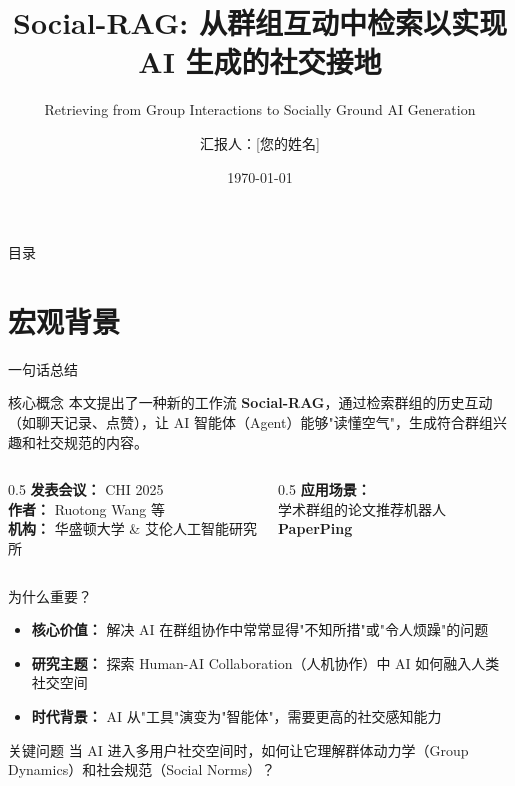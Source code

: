 \documentclass[UTF8,aspectratio=169]{ctexbeamer}
\title{Social-RAG: 从群组互动中检索以实现 AI 生成的社交接地}
\subtitle{Retrieving from Group Interactions to Socially Ground AI Generation}
\author{汇报人：[您的姓名]}
\institute{课程：人机交互}
\date{\today}
\begin{document}
\begin{frame}
\titlepage
\end{frame}

\begin{frame}{目录}
\tableofcontents
\end{frame}

\section{宏观背景}

\begin{frame}{一句话总结}
\begin{block}{核心概念}
本文提出了一种新的工作流 \textbf{Social-RAG}，通过检索群组的历史互动（如聊天记录、点赞），让 AI 智能体（Agent）能够\textcolor{myblue}{"读懂空气"}，生成符合群组兴趣和社交规范的内容。
\end{block}

\vspace{0.5cm}

\begin{columns}[T]
\begin{column}{0.5\textwidth}
\textbf{发表会议：} CHI 2025 \\
\textbf{作者：} Ruotong Wang 等 \\
\textbf{机构：} 华盛顿大学 \& 艾伦人工智能研究所
\end{column}
\begin{column}{0.5\textwidth}
\textbf{应用场景：} \\
学术群组的论文推荐机器人 \textbf{PaperPing}
\end{column}
\end{columns}
\end{frame}

\begin{frame}{为什么重要？}
\begin{itemize}
\item \textbf{核心价值：} 解决 AI 在群组协作中常常显得"不知所措"或"令人烦躁"的问题
\item \textbf{研究主题：} 探索 \textcolor{myblue}{Human-AI Collaboration}（人机协作）中 AI 如何融入人类社交空间
\item \textbf{时代背景：} AI 从"工具"演变为"智能体"，需要更高的社交感知能力
\end{itemize}

\vspace{0.5cm}

\begin{alertblock}{关键问题}
当 AI 进入多用户社交空间时，如何让它理解群体动力学（Group Dynamics）和社会规范（Social Norms）？
\end{alertblock}
\end{frame}
\end{document}

